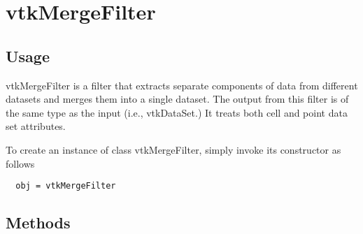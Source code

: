 \section{vtkMergeFilter}

\subsection{Usage}

 vtkMergeFilter is a filter that extracts separate components of data from
 different datasets and merges them into a single dataset. The output from
 this filter is of the same type as the input (i.e., vtkDataSet.) It treats 
 both cell and point data set attributes.

To create an instance of class vtkMergeFilter, simply
invoke its constructor as follows
\begin{verbatim}
  obj = vtkMergeFilter
\end{verbatim}
\subsection{Methods}

